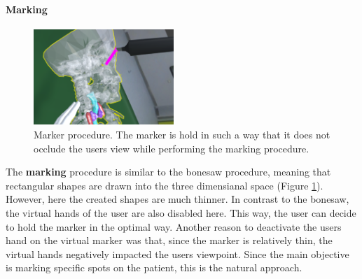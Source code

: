 \paragraph{Marking}

\begin{figure}[ht]
    \centering
    \includegraphics[width=200px]{images/implementation/features/procedures/marker.png}
    \caption{\label{fig::FeatureMarker}Marker procedure. The marker is hold in such a way that it does not occlude the users view while performing the marking procedure.}
\end{figure}

The \textbf{marking} procedure is similar to the bonesaw procedure, meaning that rectangular shapes are drawn into the three dimensianal space (Figure \ref{fig::FeatureMarker}).
However, here the created shapes are much thinner.
In contrast to the bonesaw, the virtual hands of the user are also disabled here.
This way, the user can decide to hold the marker in the optimal way.
Another reason to deactivate the users hand on the virtual marker was that, since the marker is relatively thin, the virtual hands negatively impacted the users viewpoint.
Since the main objective is marking specific spots on the patient, this is the natural approach.